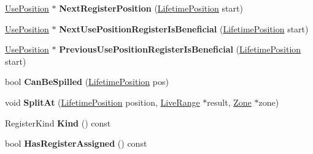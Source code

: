 \begin{DoxyCompactItemize}
\item 
\hyperlink{classv8_1_1internal_1_1_use_position}{Use\+Position} $\ast$ {\bfseries Next\+Register\+Position} (\hyperlink{classv8_1_1internal_1_1_lifetime_position}{Lifetime\+Position} start)\hypertarget{classv8_1_1internal_1_1_live_range_a7b60252c67b95b3091aacb9495126122}{}\label{classv8_1_1internal_1_1_live_range_a7b60252c67b95b3091aacb9495126122}

\item 
\hyperlink{classv8_1_1internal_1_1_use_position}{Use\+Position} $\ast$ {\bfseries Next\+Use\+Position\+Register\+Is\+Beneficial} (\hyperlink{classv8_1_1internal_1_1_lifetime_position}{Lifetime\+Position} start)\hypertarget{classv8_1_1internal_1_1_live_range_a0565e8c06effb699fc295da60310cb68}{}\label{classv8_1_1internal_1_1_live_range_a0565e8c06effb699fc295da60310cb68}

\item 
\hyperlink{classv8_1_1internal_1_1_use_position}{Use\+Position} $\ast$ {\bfseries Previous\+Use\+Position\+Register\+Is\+Beneficial} (\hyperlink{classv8_1_1internal_1_1_lifetime_position}{Lifetime\+Position} start)\hypertarget{classv8_1_1internal_1_1_live_range_a6b69d6bc73849c7634f1949ef22d065d}{}\label{classv8_1_1internal_1_1_live_range_a6b69d6bc73849c7634f1949ef22d065d}

\item 
bool {\bfseries Can\+Be\+Spilled} (\hyperlink{classv8_1_1internal_1_1_lifetime_position}{Lifetime\+Position} pos)\hypertarget{classv8_1_1internal_1_1_live_range_af065b9f68029ad43cf11fd29573dd32e}{}\label{classv8_1_1internal_1_1_live_range_af065b9f68029ad43cf11fd29573dd32e}

\item 
void {\bfseries Split\+At} (\hyperlink{classv8_1_1internal_1_1_lifetime_position}{Lifetime\+Position} position, \hyperlink{classv8_1_1internal_1_1_live_range}{Live\+Range} $\ast$result, \hyperlink{classv8_1_1internal_1_1_zone}{Zone} $\ast$zone)\hypertarget{classv8_1_1internal_1_1_live_range_af6b33331f5944c9d42f58f4dd218256f}{}\label{classv8_1_1internal_1_1_live_range_af6b33331f5944c9d42f58f4dd218256f}

\item 
Register\+Kind {\bfseries Kind} () const \hypertarget{classv8_1_1internal_1_1_live_range_a8f1a924f788aea83da136eee806438fb}{}\label{classv8_1_1internal_1_1_live_range_a8f1a924f788aea83da136eee806438fb}

\item 
bool {\bfseries Has\+Register\+Assigned} () const \hypertarget{classv8_1_1internal_1_1_live_range_a186788ab3b77e3eee40e1092a27ae6fe}{}\label{classv8_1_1internal_1_1_live_range_a186788ab3b77e3eee40e1092a27ae6fe}


\end{DoxyCompactItemize}
